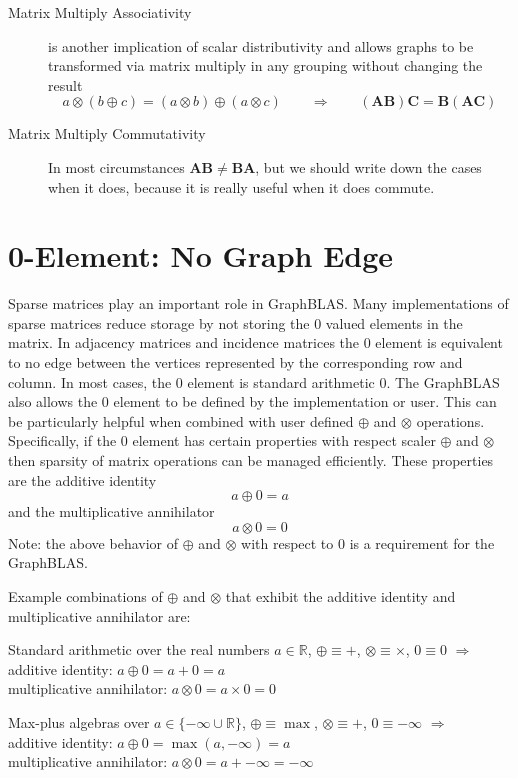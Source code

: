 \begin{description}
\item[Matrix Multiply Associativity] is another implication of scalar distributivity and allows graphs to be transformed via matrix multiply in any grouping without changing the result
  $$
      a \otimes (b \oplus c) = (a \otimes b) \oplus (a \otimes c)   ~~~~~~~~~ \Rightarrow ~~~~~~~~~
      (\mathbf{A} \mathbf{B}) \mathbf{C} = \mathbf{B} (\mathbf{A} \mathbf{C})
  $$
\item[Matrix Multiply Commutativity] In most circumstances $\mathbf{A} \mathbf{B} \neq \mathbf{B} \mathbf{A}$, but we should write down the cases when it does, because it is really useful when it does commute.

\end{description}


\section{0-Element: No Graph Edge}
  Sparse matrices play an important role in GraphBLAS.  Many implementations of sparse matrices reduce storage by not storing the 0 valued elements in the matrix.  In adjacency matrices and incidence matrices the 0 element is equivalent to no edge between the vertices represented by the corresponding row and column. In most cases, the 0 element is standard arithmetic 0.  The GraphBLAS also allows the 0 element to be defined by the implementation or user.  This can be particularly helpful when combined with user defined $\oplus$ and $\otimes$ operations.  Specifically, if the 0 element has certain properties with respect scaler $\oplus$ and $\otimes$ then sparsity of matrix operations can be managed efficiently.  These properties are the additive identity
$$
     a \oplus 0 = a
$$
and the multiplicative annihilator
$$
     a \otimes 0 = 0
$$
Note: the above behavior of $\oplus$ and $\otimes$ with respect to 0 is a requirement for the GraphBLAS.

  Example combinations of $\oplus$ and $\otimes$ that exhibit the additive identity and multiplicative annihilator are:

Standard arithmetic over the real numbers $a \in \mathbb{R}$, 
$\oplus \equiv +$, $\otimes \equiv \times$, $0 \equiv 0$ $\Rightarrow$ \\
additive identity: $a \oplus 0  =  a + 0 = a$ \\
multiplicative annihilator: $a \otimes 0 = a \times 0 = 0$

Max-plus algebras over $a \in \{-\infty \cup \mathbb{R}\}$, $\oplus \equiv \max$, $\otimes \equiv +$, $0 \equiv -\infty$ $\Rightarrow$ \\
additive identity: $a \oplus 0  =  \max(a,-\infty) = a$ \\
multiplicative annihilator: $a \otimes 0 = a + -\infty = -\infty$

